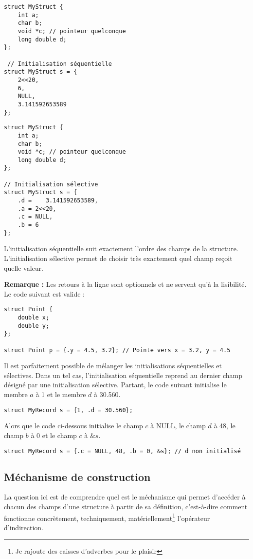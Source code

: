 \documentclass[../../../main.tex]{subfiles}
\begin{document}
\begin{minipage}{0.5\textwidth}
\begin{verbatim}
struct MyStruct {
	int a;
	char b;
	void *c; // pointeur quelconque
	long double d; 
};

 // Initialisation séquentielle
struct MyStruct s = {
	2<<20,
	6,
	NULL,
	3.141592653589
};
\end{verbatim}
\end{minipage}
\begin{minipage}{0.5\textwidth}
\begin{verbatim}
struct MyStruct {
	int a;
	char b;
	void *c; // pointeur quelconque
	long double d;
};

// Initialisation sélective
struct MyStruct s = {
	.d =	3.141592653589,
	.a = 2<<20,
	.c = NULL,
	.b = 6
}; 
\end{verbatim}
\end{minipage}

L'initialisation séquentielle suit exactement l'ordre des champs de la structure.
\newline
L'initialisation sélective permet de choisir très exactement quel champ reçoit quelle valeur.
 
\textbf{Remarque :} Les retours à la ligne sont optionnels et ne servent qu'à la lisibilité. Le code suivant est valide :
\begin{verbatim}
struct Point {
	double x;
	double y;
};

struct Point p = {.y = 4.5, 3.2}; // Pointe vers x = 3.2, y = 4.5
\end{verbatim}
Il est parfaitement possible de mélanger les initialisations séquentielles et sélectives. Dans un tel cas, l’initialisation séquentielle reprend au dernier champ désigné par une initialisation sélective. Partant, le code suivant initialise le membre $a$ à 1 et le membre $d$ à 30.560.
\begin{verbatim}
struct MyRecord s = {1, .d = 30.560};
\end{verbatim}
Alors que le code ci-dessous initialise le champ $c$ à \textsf{NULL}, le champ $d$ à 48, le champ $b$ à 0 et le champ $c$ à $\&s$.
\begin{verbatim}
struct MyRecord s = {.c = NULL, 48, .b = 0, &s}; // d non initialisé
\end{verbatim}
\subsection{Méchanisme de construction}
La question ici est de comprendre quel est le méchanisme qui permet d'accéder à chacun des champs d'une structure à partir de sa définition, c'est-à-dire comment fonctionne concrètement, techniquement, matériellement\footnote{Je rajoute des caisses d'adverbes pour le plaisir} l'opérateur d'indirection.
\end{document}
